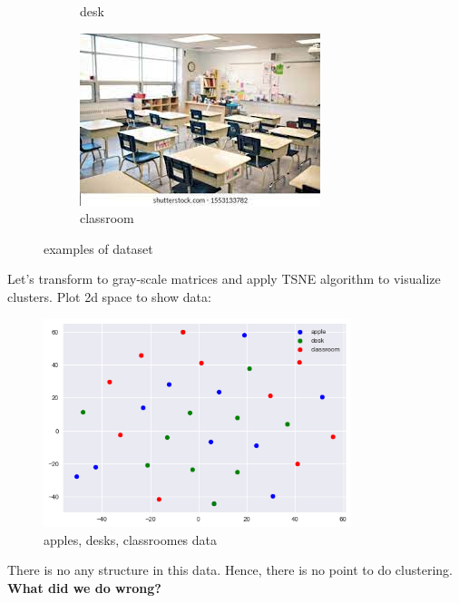 \documentclass{homework}
\begin{document}
\begin{figure}[hbt!]
\begin{subfigure}[b]{0.2\textwidth}
         \caption{desk}
     \end{subfigure}
     \hfill
     \begin{subfigure}[b]{0.2\textwidth}
         \centering
         \includegraphics[width=\textwidth]{classroom.png}
         \caption{classroom}
     \end{subfigure}
        \caption{examples of dataset}
\end{figure}

Let's transform to gray-scale matrices and apply TSNE algorithm to visualize clusters. Plot 2d space to show data:
\begin{figure}[hbt!]
	\centering
	\includegraphics[width=0.8\textwidth]{my_clusters.png}
	\caption{apples, desks, classroomes data}
\end{figure}

There is no any structure in this data. Hence, there is no point to do clustering.
\textbf{What did we do wrong?}
\end{document}
